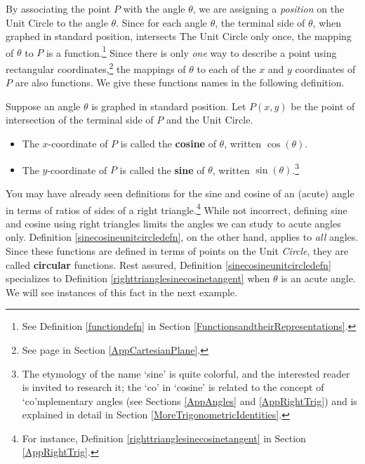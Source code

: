 \documentclass{ximera}
\begin{document}
 By associating the point $P$ with the angle $\theta$, we are assigning a \emph{position} on the Unit Circle to the angle $\theta$.  Since for each angle $\theta$, the terminal side of $\theta$, when graphed in standard position, intersects The Unit Circle only once, the mapping of $\theta$ to $P$ is a function.\footnote{See Definition \ref{functiondefn} in Section \ref{FunctionsandtheirRepresentations}.}   Since there is only \textit{one} way to describe a point using rectangular coordinates,\footnote{See page \pageref{importantfactscartesianplane} in Section \ref{AppCartesianPlane}.}  the mappings of $\theta$ to each of the $x$ and $y$ coordinates of $P$ are also functions.  We give these functions names in the following definition.
 
 
 

\begin{definition} \label{sinecosineunitcircledefn}  Suppose an angle $\theta$ is graphed in standard position. Let $P(x,y)$ be the point of intersection of the terminal side of $P$ and the Unit Circle.  

\begin{itemize}

\item The $x$-coordinate of $P$ is called the  \textbf{cosine} of $\theta$, written $\cos(\theta)$.

\item The $y$-coordinate of $P$ is called the  \textbf{sine} of $\theta$, written $\sin(\theta)$.\footnote{The etymology of the name `sine' is quite colorful, and the interested reader is invited to research it;  the `co' in `cosine' is related to the concept of `co'mplementary angles (see Sections \ref{AppAngles} and \ref{AppRightTrig}) and is explained in detail in Section \ref{MoreTrigonometricIdentities}.} 

\end{itemize}

\end{definition}

 

You may have already seen definitions for the sine and cosine of an (acute) angle  in terms of ratios of sides of a right triangle.\footnote{For instance, Definition \ref{righttrianglesinecosinetangent} in Section \ref{AppRightTrig}.}  While not incorrect, defining sine and cosine using right triangles limits the angles we can study to acute angles only.  Definition \ref{sinecosineunitcircledefn}, on the other hand, applies to \textit{all} angles. Since these functions are defined in terms of points on the Unit \textit{Circle}, they are called  \textbf{circular} functions.  Rest assured,  Definition \ref{sinecosineunitcircledefn} specializes to Definition \ref{righttrianglesinecosinetangent} when $\theta$ is an acute angle.  We will see instances of this fact in the next example.
\end{document}
